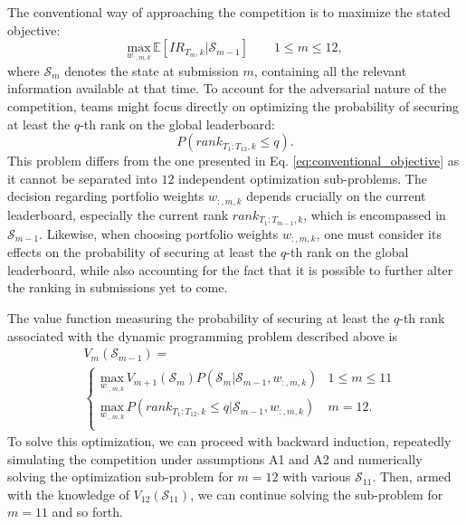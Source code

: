 \documentclass[3p,times,twocolumn]{elsarticle}
\begin{document}
The conventional way of approaching the competition is to maximize the stated objective:
\begin{equation}\label{eq:conventional_objective}
    \underset{ w_{:,m,k}}{\textrm{max}}\, \mathbb{E}\left[ IR_{T_m,k} | \mathcal{S}_{m-1}\right] \qquad 1\leq m\leq 12,
\end{equation}
where $\mathcal{S}_{m}$ denotes the state at submission $m$, containing all the relevant information available at that time.
To account for the adversarial nature of the competition, teams might focus directly on optimizing the probability of securing at least the $q$-th rank on the global leaderboard:
\begin{equation}
    P\left(rank_{T_1:T_{12},k}\leq q\right).
\end{equation}
This problem differs from the one presented in Eq. \ref{eq:conventional_objective} as it cannot be separated into $12$ independent optimization sub-problems.
The decision regarding portfolio weights $w_{:,m,k}$ depends crucially on the current leaderboard, especially the current rank $rank_{T_1:T_{m-1},k}$, which is encompassed in $\mathcal{S}_{m-1}$.
Likewise, when choosing portfolio weights $w_{:,m,k}$, one must consider its effects on the probability of securing at least the $q$-th rank on the global leaderboard, while also accounting for the fact that it is possible to further alter the ranking in submissions yet to come.

The value function measuring the probability of securing at least the $q$-th rank associated with the dynamic programming problem described above is
\begin{equation}
    \begin{split}
        &V_{m}(\mathcal{\mathcal{S}}_{m-1})=\\
        &\begin{cases}
            \underset{ w_{:,m,k}}{\textrm{max}} \, V_{m+1}(\mathcal{\mathcal{S}}_{m})P\left( \mathcal{\mathcal{S}}_{m}| \mathcal{\mathcal{S}}_{m-1}, w_{:,m,k}\right) & 1\leq m \leq 11 \\
            \underset{ w_{:,m,k}}{\textrm{max}} \, P\left(rank_{T_1:T_{12},k}\leq q| \mathcal{\mathcal{S}}_{m-1}, w_{:,m,k}\right)                                    & m=12.           \\
        \end{cases}
    \end{split}
\end{equation}
To solve this optimization, we can proceed with backward induction, repeatedly simulating the competition under assumptions A1 and A2 and numerically solving the optimization sub-problem for $m=12$ with various $\mathcal{S}_{11}$.
Then, armed with the knowledge of $V_{12}(\mathcal{S}_{11})$, we can continue solving the sub-problem for $m=11$ and so forth.
\end{document}
